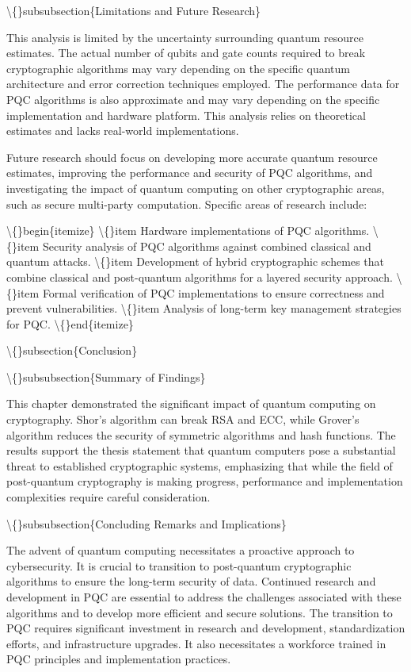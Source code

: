 \documentclass{article}
\begin{document}
\textbackslash\{\}subsubsection\{Limitations and Future Research\}

This analysis is limited by the uncertainty surrounding quantum resource estimates. The actual number of qubits and gate counts required to break cryptographic algorithms may vary depending on the specific quantum architecture and error correction techniques employed. The performance data for PQC algorithms is also approximate and may vary depending on the specific implementation and hardware platform. This analysis relies on theoretical estimates and lacks real-world implementations.

Future research should focus on developing more accurate quantum resource estimates, improving the performance and security of PQC algorithms, and investigating the impact of quantum computing on other cryptographic areas, such as secure multi-party computation. Specific areas of research include:

\textbackslash\{\}begin\{itemize\}
    \textbackslash\{\}item Hardware implementations of PQC algorithms.
    \textbackslash\{\}item Security analysis of PQC algorithms against combined classical and quantum attacks.
    \textbackslash\{\}item Development of hybrid cryptographic schemes that combine classical and post-quantum algorithms for a layered security approach.
    \textbackslash\{\}item Formal verification of PQC implementations to ensure correctness and prevent vulnerabilities.
    \textbackslash\{\}item Analysis of long-term key management strategies for PQC.
\textbackslash\{\}end\{itemize\}

\textbackslash\{\}subsection\{Conclusion\}

\textbackslash\{\}subsubsection\{Summary of Findings\}

This chapter demonstrated the significant impact of quantum computing on cryptography. Shor's algorithm can break RSA and ECC, while Grover's algorithm reduces the security of symmetric algorithms and hash functions. The results support the thesis statement that quantum computers pose a substantial threat to established cryptographic systems, emphasizing that while the field of post-quantum cryptography is making progress, performance and implementation complexities require careful consideration.

\textbackslash\{\}subsubsection\{Concluding Remarks and Implications\}

The advent of quantum computing necessitates a proactive approach to cybersecurity. It is crucial to transition to post-quantum cryptographic algorithms to ensure the long-term security of data. Continued research and development in PQC are essential to address the challenges associated with these algorithms and to develop more efficient and secure solutions. The transition to PQC requires significant investment in research and development, standardization efforts, and infrastructure upgrades. It also necessitates a workforce trained in PQC principles and implementation practices.
\end{document}
